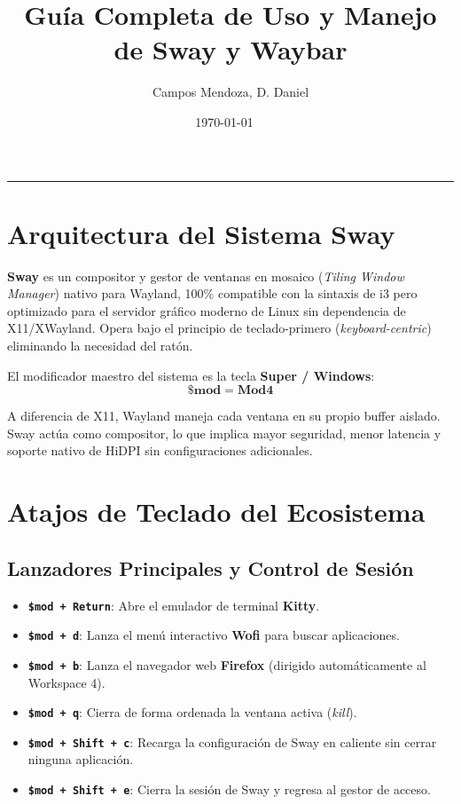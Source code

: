 \documentclass[11pt,article,spanish]{apuntes-scr}
\title[Gestor de Ventanas en Mosaico (Tiling) y Barra de Estado para Wayland]{Guía Completa de Uso y Manejo de Sway y Waybar}
\author{Campos Mendoza, D. Daniel}
\date{\today\ \textperiodcentered\ \DTMcurrenttime}
\begin{document}
\maketitle
\tableofcontents
\vspace{1.5em}\hrule\vspace{1.5em}

\section{Arquitectura del Sistema Sway}
\textbf{Sway} es un compositor y gestor de ventanas en mosaico (\textit{Tiling Window Manager}) nativo para Wayland, 100\% compatible con la sintaxis de i3 pero optimizado para el servidor gráfico moderno de Linux sin dependencia de X11/XWayland. Opera bajo el principio de teclado-primero (\textit{keyboard-centric}) eliminando la necesidad del ratón.

El modificador maestro del sistema es la tecla \textbf{Super / Windows}:
$$\mathbf{\$mod = \text{Mod4}}$$

\begin{notabox}
  A diferencia de X11, Wayland maneja cada ventana en su propio buffer aislado. Sway actúa como compositor, lo que implica mayor seguridad, menor latencia y soporte nativo de HiDPI sin configuraciones adicionales.
\end{notabox}

\section{Atajos de Teclado del Ecosistema}

\subsection{Lanzadores Principales y Control de Sesión}
\begin{itemize}[leftmargin=*]
    \item \textbf{\texttt{\$mod + Return}}: Abre el emulador de terminal \textbf{Kitty}.
    \item \textbf{\texttt{\$mod + d}}: Lanza el menú interactivo \textbf{Wofi} para buscar aplicaciones.
    \item \textbf{\texttt{\$mod + b}}: Lanza el navegador web \textbf{Firefox} (dirigido automáticamente al Workspace 4).
    \item \textbf{\texttt{\$mod + q}}: Cierra de forma ordenada la ventana activa (\textit{kill}).
    \item \textbf{\texttt{\$mod + Shift + c}}: Recarga la configuración de Sway en caliente sin cerrar ninguna aplicación.
    \item \textbf{\texttt{\$mod + Shift + e}}: Cierra la sesión de Sway y regresa al gestor de acceso.
\end{itemize}
\end{document}
